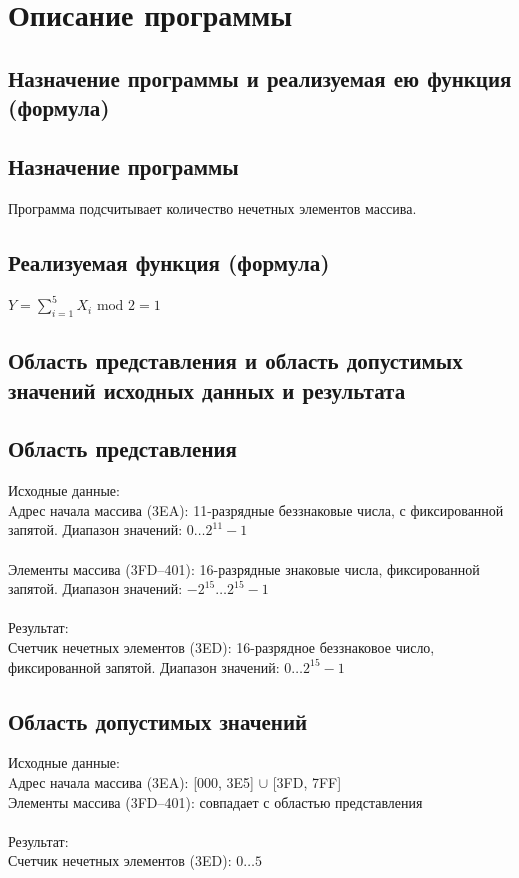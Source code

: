 \section{Описание программы}
\subsection{Назначение программы и реализуемая ею функция (формула)}
\subsection*{Назначение программы}
\noindent Программа подсчитывает количество нечетных элементов массива.

\subsection*{Реализуемая функция (формула)}

\noindent $Y=\sum_{i=1}^{5} X_{i} \text { mod } 2=1$

\subsection{Область представления и область допустимых значений исходных данных и результата}

\subsection*{Область представления}
\noindent
Исходные данные: \\
Aдрес начала массива (3EA): 11-разрядные беззнаковые числа, с фиксированной запятой. Диапазон значений: $0\ldots2^{11}-1$ \\\\
Элементы массива (3FD--401): 16-разрядные знаковые числа, фиксированной запятой. Диапазон значений:  $-2^{15}\ldots2^{15}-1$ \\\\
Результат: \\
Счетчик нечетных элементов (3ED): 16-разрядное беззнаковое число, фиксированной запятой. Диапазон значений:  $0\ldots2^{15}-1$

\subsection*{Область допустимых значений}
\noindent Исходные данные: \\
Aдрес начала массива (3EA): [000, 3E5] $\cup$ [3FD, 7FF] \\
Элементы массива (3FD--401): совпадает с областью представления\\\\
Результат: \\
Счетчик нечетных элементов (3ED): $0\ldots5$

